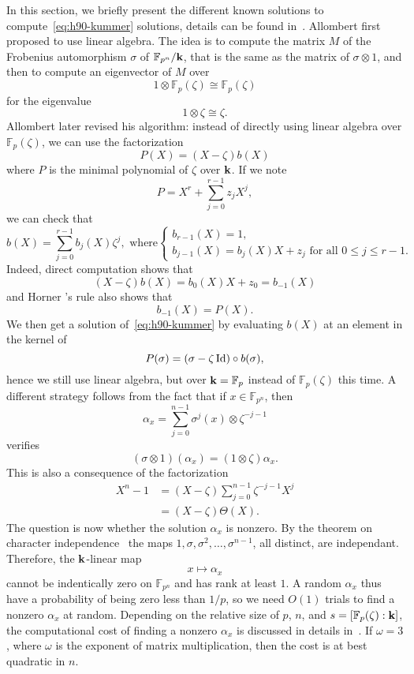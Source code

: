 In this section, we briefly present the different known solutions to
compute~\eqref{eq:h90-kummer} solutions, details can be found in~\cite{BDDFS17}.
Allombert first proposed to use linear
algebra. The idea is to compute the matrix $M$ of the Frobenius automorphism
$\sigma$ of $\mathbb{F}_{p^n}/\mathbf{k}$, that is the same as the matrix of
$\sigma\otimes1$, and then to compute an eigenvector of $M$ over
\[
  1\otimes\mathbb{F}_{p}(\zeta) \cong \mathbb{F}_{p}(\zeta)
\]
for the eigenvalue
\[
  1\otimes\zeta\cong\zeta.
\]
Allombert later revised his algorithm: instead of directly using linear algebra over
$\mathbb{F}_{p}(\zeta)$, we can use the factorization
\[
  P(X) = (X-\zeta)b(X)
\]
where $P$ is the minimal polynomial of $\zeta$ over $\mathbf{k}$. If we note
\[
  P = X^r + \sum_{j=0}^{r-1}z_jX^j,
\]
we can check that
\[
  b(X) = \sum_{j=0}^{r-1}b_j(X)\zeta^j,\text{ where}
  \left\{ 
    \begin{array}{l}
      b_{r-1}(X) = 1,\\
      b_{j-1}(X) = b_j(X) X + z_j\text{ for all } 0\leq j\leq r-1.
    \end{array}
  \right.
\]
Indeed, direct computation shows that
\[
  (X-\zeta)b(X) = b_0(X)X+z_0  = b_{-1}(X)
\]
and Horner 's rule also shows that
\[
  b_{-1}(X) = P(X).
\]
We then get a solution of~\eqref{eq:h90-kummer} by evaluating $b(X)$ at an
element in the kernel of 
\[
  P(\sigma)=(\sigma-\zeta\operatorname{Id})\circ b(\sigma),
\]
hence we still use linear algebra, but
over $\mathbf{k}=\mathbb{F}_p$ instead of $\mathbb{F}_{p}(\zeta)$ this time. A different
strategy follows from the fact that if $x\in\mathbb{F}_{p^n}$, then
\[
  \alpha_x=\sum_{j=0}^{n-1}\sigma^j(x)\otimes\zeta^{-j-1}
\]
verifies
\[
  (\sigma\otimes1)(\alpha_x) = (1\otimes\zeta)\alpha_x.
\]
This is also a consequence of the factorization
\begin{align*}
  X^n-1 &= (X-\zeta)\sum_{j=0}^{n-1}\zeta^{-j-1}X^j\\
  &= (X-\zeta)\Theta(X).
\end{align*}
The question is now whether the solution $\alpha_x$ is nonzero. By the theorem
on character independence~\cite[Chapter VI, §4]{Lang04} the maps
$1, \sigma, \sigma^2, \dots, \sigma^{n-1}$, all distinct, are independant.
Therefore, the $\mathbf{k}$-linear map
\[
  x\mapsto\alpha_x
\]
cannot be indentically zero on $\mathbb{F}_{p^n}$ and has rank at least $1$. A
random $\alpha_x$ thus have a probability of being zero less than $1/p$, so we
need $O(1)$ trials to find a nonzero $\alpha_x$ at random. Depending on the
relative size of $p$, $n$, and $s=\left[ \mathbb{F}_p(\zeta):\mathbf{k} \right]$, the
computational cost of finding a nonzero $\alpha_x$ is discussed in details
in~\cite{BDDFS17}. If $\omega=3$, where $\omega$ is the exponent of matrix
multiplication, then the cost is at best quadratic in $n$.


